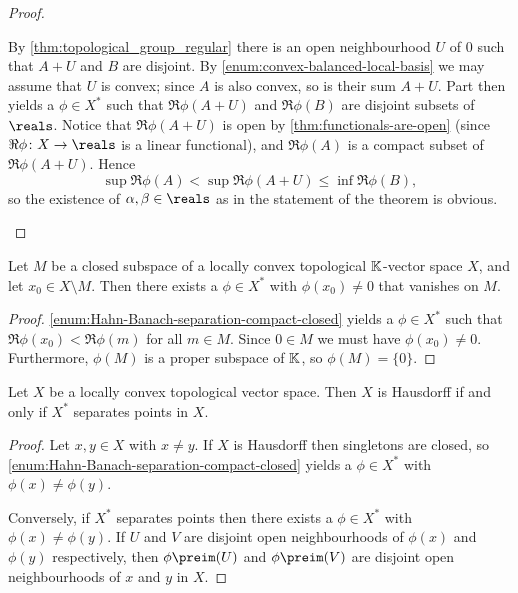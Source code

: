 \documentclass[article, a4paper, 11pt, oneside]{memoir}
\numberwithin{equation}{chapter}
\begin{document}
\begin{proof}
\begin{proofsec}
    \item[Proof of \subcref{enum:Hahn-Banach-separation-compact-closed}]
    By \cref{thm:topological_group_regular} there is an open neighbourhood $U$ of $0$ such that $A + U$ and $B$ are disjoint. By \cref{enum:convex-balanced-local-basis} we may assume that $U$ is convex; since $A$ is also convex, so is their sum $A + U$. Part  then yields a $\phi \in X^*$ such that $\Re\phi(A+U)$ and $\Re\phi(B)$ are disjoint subsets of $\reals$. Notice that $\Re\phi(A+U)$ is open by \cref{thm:functionals-are-open} (since $\Re\phi \colon X \to \reals$ is a linear functional), and $\Re\phi(A)$ is a compact subset of $\Re\phi(A+U)$. Hence
    \begin{equation*}
        \sup \Re\phi(A)
            < \sup \Re\phi(A+U)
            \leq \inf \Re\phi(B),
    \end{equation*}
    so the existence of $\alpha, \beta \in \reals$ as in the statement of the theorem is obvious.
\end{proofsec}
\end{proof}


\begin{corollary}
    Let $M$ be a closed subspace of a locally convex topological $\mathbb{K}$-vector space $X$, and let $x_0 \in X \setminus M$. Then there exists a $\phi \in X^*$ with $\phi(x_0) \neq 0$ that vanishes on $M$.
\end{corollary}

\begin{proof}
    \cref{enum:Hahn-Banach-separation-compact-closed} yields a $\phi \in X^*$ such that $\Re \phi(x_0) < \Re \phi(m)$ for all $m \in M$. Since $0 \in M$ we must have $\phi(x_0) \neq 0$. Furthermore, $\phi(M)$ is a proper subspace of $\mathbb{K}$, so $\phi(M) = \{0\}$.
\end{proof}

\begin{corollary}
    \label{thm:X*-separating-points-Hausdorff}
    Let $X$ be a locally convex topological vector space. Then $X$ is Hausdorff if and only if $X^*$ separates points in $X$.
\end{corollary}

\begin{proof}
    Let $x,y \in X$ with $x \neq y$. If $X$ is Hausdorff then singletons are closed, so \cref{enum:Hahn-Banach-separation-compact-closed} yields a $\phi \in X^*$ with $\phi(x) \neq \phi(y)$.

    Conversely, if $X^*$ separates points then there exists a $\phi \in X^*$ with $\phi(x) \neq \phi(y)$. If $U$ and $V$ are disjoint open neighbourhoods of $\phi(x)$ and $\phi(y)$ respectively, then $\phi\preim(U)$ and $\phi\preim(V)$ are disjoint open neighbourhoods of $x$ and $y$ in $X$.
\end{proof}
\end{document}
